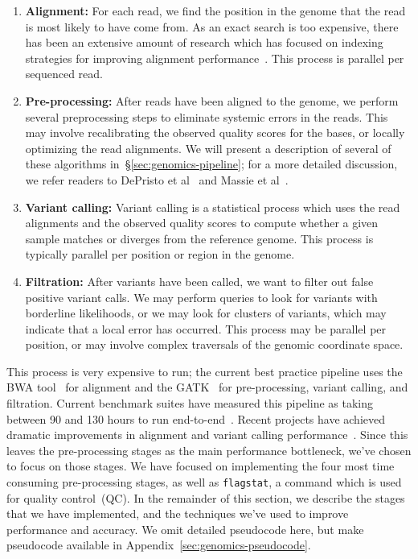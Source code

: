 \documentclass{acm_proc_article-sp}
\begin{document}
\begin{enumerate}
\item \textbf{Alignment:} For each read, we find the position in the genome that the read is most likely to
have come from. As an exact search is too expensive, there has been an extensive amount of research
which has focused on indexing strategies for improving alignment performance~\cite{li10, li11,
zaharia11}. This process is parallel per sequenced read.
\item \textbf{Pre-processing:} After reads have been aligned to the genome, we perform several
preprocessing steps to eliminate systemic errors in the reads. This may involve recalibrating the
observed quality scores for the bases, or locally optimizing the read alignments. We will present a
description of several of these algorithms in~\S\ref{sec:genomics-pipeline}; for a more detailed
discussion, we refer readers to DePristo et al~\cite{depristo11} and Massie et al~\cite{massie13}.
\item \textbf{Variant calling:} Variant calling is a statistical process which uses the read alignments
and the observed quality scores to compute whether a given sample \linebreak matches or diverges
from the reference genome. This process is typically parallel per position or region in the genome.
\item \textbf{Filtration:} After variants have been called, we want to filter out false positive variant calls.
We may perform queries to look for variants with borderline likelihoods, or we may look for clusters of
variants, which may indicate that a local error has occurred. This process may be parallel per position,
or may involve complex traversals of the genomic coordinate space.
\end{enumerate}

This process is very expensive to run; the current best practice pipeline uses the BWA tool~\cite{li10} for
alignment and the GATK~\cite{mckenna10, depristo11} for pre-processing, variant calling, and filtration.
Current benchmark suites have measured this pipeline as taking between 90 and 130 hours to run
end-to-end~\cite{talwalkar14}. Recent projects have achieved dramatic improvements in alignment and
variant calling performance~\cite{zaharia11, rimmer14}. Since this leaves the pre-processing stages as
the main performance bottleneck, we've chosen to focus on those stages. We have focused on
implementing the four most time consuming pre-processing stages, as well as \texttt{flagstat}, a
command which is used for quality control~(QC). In the remainder of this section, we describe the
stages that we have implemented, and the techniques we've used to improve performance and
accuracy. We omit detailed pseudocode here, but make pseudocode available in
Appendix~\ref{sec:genomics-pseudocode}.
\end{document}
